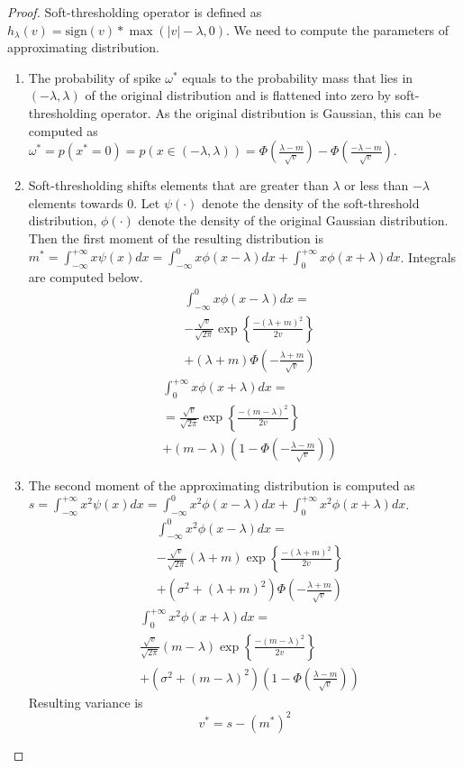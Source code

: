 \documentclass[letterpaper]{article}
\begin{document}
\begin{proof}
Soft-thresholding operator is defined as $h_\lambda(v) = \text{sign}(v) * \max(|v| - \lambda, 0)$. We need to compute the parameters of approximating distribution.
\begin{enumerate}
\item The probability of spike $\omega^*$ equals to the probability mass that lies in $(-\lambda, \lambda)$ of the original distribution and is flattened into zero by soft-thresholding operator. As the original distribution is Gaussian, this can be computed as $\omega^* = p(x^*=0) = p(x \in (-\lambda, \lambda)) = \Phi(\frac{\lambda-m}{\sqrt{v}}) - \Phi(\frac{-\lambda-m}{\sqrt{v}})$. 
\item Soft-thresholding shifts elements that are greater than $\lambda$  or less than $-\lambda$ elements towards 0. Let $\psi(\cdot)$ denote the density of the soft-threshold distribution, $\phi(\cdot)$ denote the density of the original Gaussian distribution. Then the first moment of the resulting distribution is $m^* = \int_{-\infty}^{+\infty}x\psi(x)dx = \int_{-\infty}^{0}x\phi(x-\lambda)dx + \int_{0}^{+\infty}x\phi(x+\lambda)dx$. Integrals are computed below.
\begin{align}
&\int_{-\infty}^{0}x\phi(x-\lambda)dx = \\
&-\frac{\sqrt{v}}{\sqrt{2\pi}} \exp\left\{\frac{-(\lambda+m)^2}{2v}\right\} \\
& + (\lambda+m)\Phi\left(-\frac{\lambda+m}{\sqrt{v}}\right)
\end{align}
\begin{align}
&\int_{0}^{+\infty}x\phi(x+\lambda)dx = \\
& = \frac{\sqrt{v}}{\sqrt{2\pi}} \exp\left\{\frac{-(m - \lambda)^2}{2v}\right\}\\
& + (m - \lambda)\left(1 - \Phi\left(-\frac{\lambda-m}{\sqrt{v}}\right)\right)
\end{align}
\item The second moment of the approximating distribution is computed as $s = \int_{-\infty}^{+\infty}x^2\psi(x)dx = \int_{-\infty}^{0}x^2\phi(x-\lambda)dx + \int_{0}^{+\infty}x^2\phi(x+\lambda)dx$.
\begin{align}
&\int_{-\infty}^{0}x^2\phi(x-\lambda)dx = \\
&-\frac{\sqrt{v}}{\sqrt{2\pi}} (\lambda+m)\exp\left\{\frac{-(\lambda+m)^2}{2v}\right\}\\
& + (\sigma^2 + (\lambda+m)^2)\Phi\left(-\frac{\lambda+m}{\sqrt{v}}\right)
\end{align}
\begin{align}
&\int_{0}^{+\infty}x^2\phi(x+\lambda)dx = \\
&\frac{\sqrt{v}}{\sqrt{2\pi}} (m - \lambda)\exp\left\{\frac{-(m - \lambda)^2}{2v}\right\}\\
& + (\sigma^2 + (m - \lambda)^2)\left(1 - \Phi\left(\frac{\lambda -m}{\sqrt{v}}\right)\right)
\end{align}
Resulting variance is
\begin{equation}
v^* = s- (m^*)^2
\end{equation}
\end{enumerate}
\end{proof}
\end{document}
